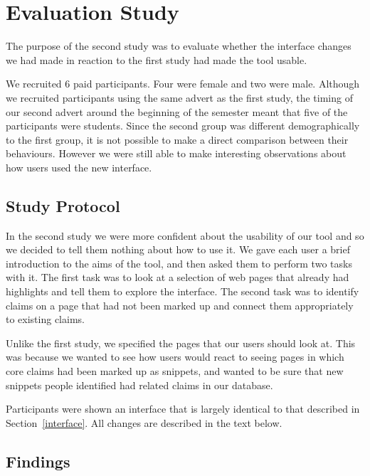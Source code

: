 \documentclass{chi2009}
\newcommand{\todo}[1]{}
\begin{document}
\todo{mention people not being sure how broad a topic should be}
\todo{mention people creating claim in one topic and not being found in other related topics}


\section{Evaluation Study}

The purpose of the second study was to evaluate whether the interface changes we had made in reaction to the first study had made the tool usable. 

We recruited 6 paid participants. Four were female and two were male. Although we recruited participants using the same advert as the first study, the timing of our second advert around the beginning of the semester meant that five of the participants were students. Since the second group was different demographically to the first group, it is not possible to make a direct comparison between their behaviours. However we were still able to make interesting observations about how users used the new interface.

\subsection{Study Protocol}

In the second study we were more confident about the usability of our tool and so we decided to tell them nothing about how to use it. We gave each user a brief introduction to the aims of the tool, and then asked them to perform two tasks with it. The first task was to look at a selection of web pages that already had highlights and tell them to explore the interface. The second task was to identify claims on a page that had not been marked up and connect them appropriately to existing claims.

Unlike the first study, we specified the pages that our users should look at. This was because we wanted to see how users would react to seeing pages in which core claims had been marked up as snippets, and wanted to be sure that new snippets people identified had related claims in our database.

Participants were shown an interface that is largely identical to that described in Section~\ref{interface}. All changes are described in the text below.

\subsection{Findings}
\end{document}
